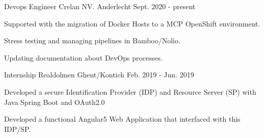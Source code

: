 

\begin{cventries}

  \cvlistentry
    {Devops Engineer} %
    {Crelan NV.} %
    {Anderlecht} %
    {Sept. 2020 - present} %
    {
      \begin{cvitems} %
	    \item {Supported with the migration of Docker Hosts to a MCP OpenShift environment.}
	    \item {Stress testing and managing pipelines in Bamboo/Nolio.}
	    \item {Updating documentation about DevOps processes.}
      \end{cvitems}
  	}

  \cvlistentry
    {Internship} %
    {Realdolmen} %
    {Ghent/Kontich} %
    {Feb. 2019 - Jun. 2019} %
    {
      \begin{cvitems} %
	    \item {Developed a secure Identification Provider (IDP) and Resource Server (SP) with Java Spring Boot and OAuth2.0}
        \item {Developed a functional Angular5 Web Application that interfaced with this IDP/SP.}
      \end{cvitems}
    }

\end{cventries}
